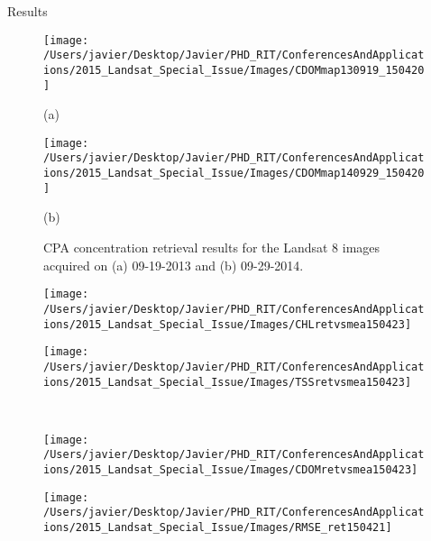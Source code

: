 \documentclass{beamer}
\begin{document}
\begin{frame}{}
\begin{columns}[t]
\begin{column}{.31\linewidth}
\begin{block}{Results}
\begin{figure}[htbp!]
  \begin{minipage}[c]{0.46\linewidth}
      \centering
      \texttt{[image: /Users/javier/Desktop/Javier/PHD\_RIT/ConferencesAndApplications/2015\_Landsat\_Special\_Issue/Images/CDOMmap130919\_150420]}\\
      \centerline{\small (a)}  
  \end{minipage}
  \hspace{1cm}
  \begin{minipage}[c]{0.46\linewidth}
      \centering
      \texttt{[image: /Users/javier/Desktop/Javier/PHD\_RIT/ConferencesAndApplications/2015\_Landsat\_Special\_Issue/Images/CDOMmap140929\_150420]}\\
      \centerline{\small (b)}
  \end{minipage}
  \caption{CPA concentration retrieval results for the Landsat 8 images acquired on (a) 09-19-2013 and (b) 09-29-2014.} 
\end{figure}


\begin{figure}[htb]
  \begin{minipage}[c]{0.47\linewidth}
      \centering
      \texttt{[image: /Users/javier/Desktop/Javier/PHD\_RIT/ConferencesAndApplications/2015\_Landsat\_Special\_Issue/Images/CHLretvsmea150423]} 
  \end{minipage}
  \hspace{0.5cm}
  \begin{minipage}[d]{0.47\linewidth}
      \centering
      \texttt{[image: /Users/javier/Desktop/Javier/PHD\_RIT/ConferencesAndApplications/2015\_Landsat\_Special\_Issue/Images/TSSretvsmea150423]}
  \end{minipage}\\
  \begin{minipage}[c]{0.47\linewidth}
      \centering
      \texttt{[image: /Users/javier/Desktop/Javier/PHD\_RIT/ConferencesAndApplications/2015\_Landsat\_Special\_Issue/Images/CDOMretvsmea150423]}  
  \end{minipage}
  \hspace{0.5cm}
  \begin{minipage}[c]{0.47\linewidth}
      \centering
      \texttt{[image: /Users/javier/Desktop/Javier/PHD\_RIT/ConferencesAndApplications/2015\_Landsat\_Special\_Issue/Images/RMSE\_ret150421]}
  \end{minipage}


\end{figure}
\end{block}
\end{column}
\end{columns}
\end{frame}
\end{document}

